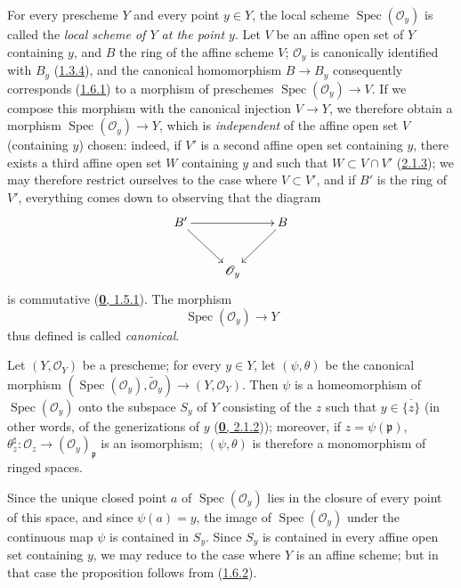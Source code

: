 For every prescheme $Y$ and every point $y\in Y$, the local scheme
$\operatorname{Spec}(\mathscr{O}_y)$ is called the \emph{local scheme of $Y$
at the point $y$}. Let $V$ be an affine open set of $Y$ containing $y$, and
$B$ the ring of the affine scheme $V$; $\mathscr{O}_y$ is canonically
identified with $B_y$ (\hyperref[I.1.3.4]{1.3.4}), and the canonical
homomorphism $B\to B_y$ consequently corresponds
(\hyperref[I.1.6.1]{1.6.1}) to a morphism of
preschemes $\operatorname{Spec}(\mathscr{O}_y)\to V$. If we compose this
morphism with the canonical injection $V\to Y$, we therefore obtain a
morphism $\operatorname{Spec}(\mathscr{O}_y)\to Y$, which is
\emph{independent} of the affine open set $V$ (containing $y$) chosen:
indeed, if $V'$ is a second affine open set containing $y$, there exists a
third affine open set $W$ containing $y$ and such that $W\subset V\cap V'$
(\hyperref[I.2.1.3]{2.1.3}); we may therefore restrict ourselves to the
case where $V\subset V'$, and if $B'$ is the ring of $V'$, everything comes
down to observing that the diagram
\label{I.2.4.1.diagram}
\[
  \xymatrix{
    B'\ar[rr]\ar[dr] & & B\ar[dl]\\
    & \mathscr{O}_y
  }
\]
is commutative (\hyperref[0.1.5.1]{\textbf{0}, 1.5.1}). The morphism
\[
  \operatorname{Spec}(\mathscr{O}_y)\to Y
\]
thus defined is called \emph{canonical}.

\begin{proposition}[2.4.2]
\label{I.2.4.2}
Let $(Y,\mathscr{O}_Y)$ be a prescheme; for every $y\in Y$, let
$(\psi,\theta)$ be the canonical morphism
$(\operatorname{Spec}(\mathscr{O}_y),\widetilde{\mathscr{O}}_y)
\to(Y,\mathscr{O}_Y)$. Then $\psi$ is a homeomorphism of
$\operatorname{Spec}(\mathscr{O}_y)$ onto the subspace $S_y$ of $Y$
consisting of the $z$ such that $y\in\overline{\{z\}}$ \textup{(in other words, of
the} generizations \textup{of} $y$ \textup{(\hyperref[0.2.1.2]{\textbf{0}, 2.1.2}))};
moreover, if $z=\psi(\mathfrak{p})$,
$\theta_z^{\sharp}:\mathscr{O}_z\to(\mathscr{O}_y)_{\mathfrak{p}}$ is an
isomorphism; $(\psi,\theta)$ is therefore a monomorphism of ringed spaces.
\end{proposition}

Since the unique closed point $a$ of $\operatorname{Spec}(\mathscr{O}_y)$
lies in the closure of every point of this space, and since $\psi(a)=y$, the
image of $\operatorname{Spec}(\mathscr{O}_y)$ under the continuous map $\psi$
is contained in $S_y$. Since $S_y$ is contained in every affine open set
containing $y$, we may reduce to the case where $Y$ is an affine scheme; but
in that case the proposition follows from
(\hyperref[I.1.6.2]{1.6.2}).


